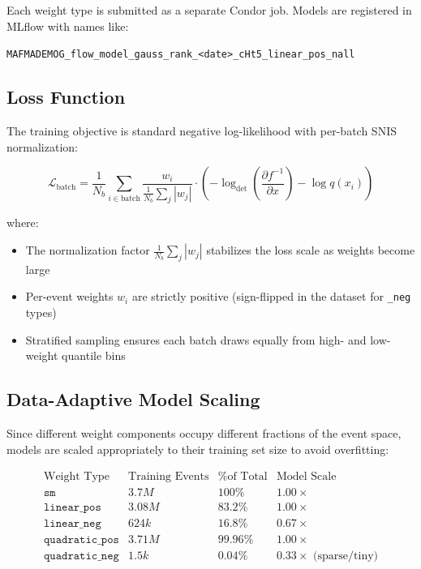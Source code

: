 \documentclass[11pt,a4paper]{article}
\begin{document}
Each weight type is submitted as a separate Condor job. Models are registered in MLflow with names like:
\begin{center}
\texttt{MAFMADEMOG\_flow\_model\_gauss\_rank\_<date>\_cHt5\_linear\_pos\_nall}
\end{center}

\subsection{Loss Function}

The training objective is standard negative log-likelihood with per-batch SNIS normalization:

\begin{equation}
\mathcal{L}_{\text{batch}} = \frac{1}{N_b} \sum_{i \in \text{batch}} \frac{w_i}{\frac{1}{N_b}\sum_j |w_j|} \cdot 
                           \left(-\log_{\det}\left(\frac{\partial f^{-1}}{\partial x}\right) - \log q(x_i)\right)
\end{equation}

where:
\begin{itemize}
  \item The normalization factor $\frac{1}{N_b}\sum_j |w_j|$ stabilizes the loss scale as weights become large
  \item Per-event weights $w_i$ are strictly positive (sign-flipped in the dataset for \texttt{\_neg} types)
  \item Stratified sampling ensures each batch draws equally from high- and low-weight quantile bins
\end{itemize}

\subsection{Data-Adaptive Model Scaling}

Since different weight components occupy different fractions of the event space, models are scaled 
appropriately to their training set size to avoid overfitting:

\begin{equation}
\begin{array}{lccc}
\text{Weight Type} & \text{Training Events} & \text{\% of Total} & \text{Model Scale} \\
\hline
\texttt{sm} & 3.7M & 100\% & 1.00\times \\
\texttt{linear\_pos} & 3.08M & 83.2\% & 1.00\times \\
\texttt{linear\_neg} & 624k & 16.8\% & 0.67\times \\
\texttt{quadratic\_pos} & 3.71M & 99.96\% & 1.00\times \\
\texttt{quadratic\_neg} & 1.5k & 0.04\% & 0.33\times \text{ (sparse/tiny)}
\end{array}
\end{equation}
\end{document}
